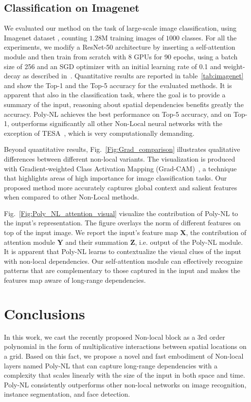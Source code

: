 \documentclass[10pt,twocolumn,letterpaper]{article}
\begin{document}
\subsection{Classification on Imagenet}
We evaluated our method on the task of large-scale image classification, using Imagenet dataset \cite{russakovsky2015imagenet}, counting $1.28$M training images of $1000$ classes. For all the experiments, we modify a ResNet-50 architecture \cite{he2016deep} by inserting a self-attention module and then train from scratch with 8 GPUs for 90 epochs, using a batch size of 256 and an SGD optimizer with an initial learning rate of 0.1 and weight-decay as described in~\cite{goyal2017accurate}. Quantitative results are reported in table~\eqref{tab:imagenet} and show the Top-1 and the Top-5 accuracy for the evaluated methods. It is apparent that also in the classification task, where the goal is to provide a summary of the input, reasoning about spatial dependencies benefits greatly the accuracy. Poly-NL achieves the best performance on Top-5 accuracy, and on Top-1, outperforms significantly all other Non-Local neural networks with the exception of TESA~\cite{babiloni2020tesa}, which is very computationally demanding. 

Beyond quantitative results, Fig.~\ref{Fig:Grad_comparison} illustrates qualitative differences between different non-local variants. The visualization is produced with Gradient-weighted Class Activation
Mapping (Grad-CAM)~\cite{selvaraju2017grad}, a technique that highlights areas of high importance for image classification tasks. Our proposed method more accurately captures global context and salient features when compared to other Non-Local methods.

Fig.~\ref{Fig:Poly_NL_attention_visual} visualize the contribution of Poly-NL to the input's representation. 
The figure overlays the norm of different features on top of the input image. We report the input's feature map $\mathbf{X}$, the contribution of attention module $\mathbf{Y}$ and their summation $\mathbf{Z}$, i.e. output of the Poly-NL module. It is apparent that Poly-NL learns to contextualize the visual clues of the input with non-local dependencies. Our self-attention module can effectively recognize patterns that are complementary to those captured in the input and makes the features map aware of long-range dependencies. 

\section{Conclusions}
In this work, we cast the recently proposed Non-local block as a 3rd order polynomial in the form of multiplicative interactions between spatial locations on a grid. Based on this fact, we propose a novel and fast embodiment of Non-local layers named Poly-NL that can capture long-range dependencies with a complexity that scales linearly with the size of the input in both space and time. Poly-NL consistently outperforms other non-local networks on image recognition, instance segmentation, and face detection. 

{\small


}
\end{document}
